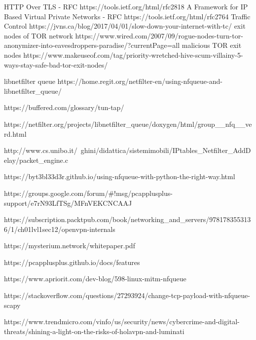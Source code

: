 \documentclass[12pt]{article}
\begin{document}
	\pagebreak

	
	\begin{thebibliography}{1}
			HTTP Over TLS - RFC
			https://tools.ietf.org/html/rfc2818
			A Framework for IP Based Virtual Private Networks - RFC
			https://tools.ietf.org/html/rfc2764
			Traffic Control
			https://jvns.ca/blog/2017/04/01/slow-down-your-internet-with-tc/
			exit nodes of TOR network
			https://www.wired.com/2007/09/rogue-nodes-turn-tor-anonymizer-into-eavesdroppers-paradise/?currentPage=all
			malicious TOR exit nodes
			https://www.makeuseof.com/tag/priority-wretched-hive-scum-villainy-5-ways-stay-safe-bad-tor-exit-nodes/

			libnetfilter queue
			https://home.regit.org/netfilter-en/using-nfqueue-and-libnetfilter_queue/
		
			https://buffered.com/glossary/tun-tap/
		
		https://netfilter.org/projects/libnetfilter_queue/doxygen/html/group__nfq__verd.html

		http://www.cs.unibo.it/~ghini/didattica/sistemimobili/IPtables_Netfilter_AddDelay/packet_engine.c

		https://byt3bl33d3r.github.io/using-nfqueue-with-python-the-right-way.html

		https://groups.google.com/forum/#!msg/pcapplusplus-support/e7rN93LfTSg/MFnVEKCNCAAJ

		https://subscription.packtpub.com/book/networking_and_servers/9781783553136/1/ch01lvl1sec12/openvpn-internals

		https://mysterium.network/whitepaper.pdf

		https://pcapplusplus.github.io/docs/features

		https://www.apriorit.com/dev-blog/598-linux-mitm-nfqueue

		https://stackoverflow.com/questions/27293924/change-tcp-payload-with-nfqueue-scapy

		https://www.trendmicro.com/vinfo/us/security/news/cybercrime-and-digital-threats/shining-a-light-on-the-risks-of-holavpn-and-luminati

	\end{thebibliography}
		
	\pagebreak
	
	
\end{document}
